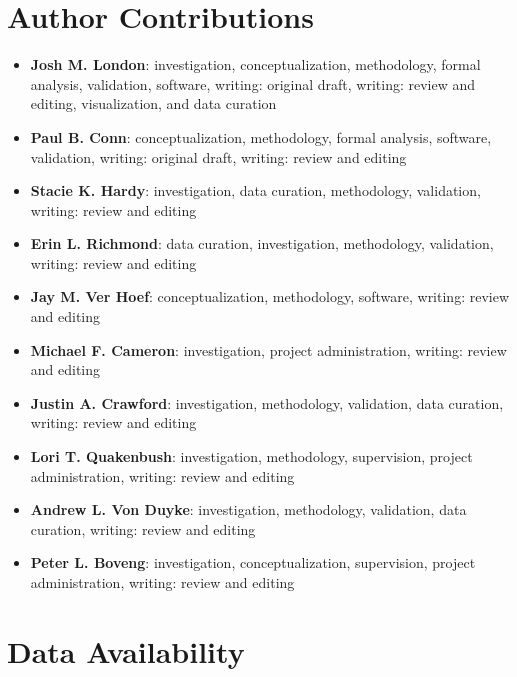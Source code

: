 \documentclass[fleqn,10pt,lineno]{wlpeerj} %
\providecommand{\tightlist}{%
  \setlength{\itemsep}{0pt}\setlength{\parskip}{0pt}}
\begin{document}
\section*{Author Contributions}\label{author-contributions}

\begin{itemize}
\tightlist
\item
  \textbf{Josh M. London}: investigation, conceptualization, methodology,
  formal analysis, validation, software, writing: original draft, writing:
  review and editing, visualization, and data curation
\item
  \textbf{Paul B. Conn}: conceptualization, methodology, formal analysis,
  software, validation, writing: original draft, writing: review and
  editing
\item
  \textbf{Stacie K. Hardy}: investigation, data curation, methodology,
  validation, writing: review and editing
\item
  \textbf{Erin L. Richmond}: data curation, investigation, methodology,
  validation, writing: review and editing
\item
  \textbf{Jay M. Ver Hoef}: conceptualization, methodology, software, writing:
  review and editing
\item
  \textbf{Michael F. Cameron}: investigation, project administration, writing:
  review and editing
\item
  \textbf{Justin A. Crawford}: investigation, methodology, validation, data curation,
  writing: review and editing
\item
  \textbf{Lori T. Quakenbush}: investigation, methodology, supervision, project
  administration, writing: review and editing
\item
  \textbf{Andrew L. Von Duyke}: investigation, methodology, validation, data curation,
  writing: review and editing
\item
  \textbf{Peter L. Boveng}: investigation, conceptualization, supervision,
  project administration, writing: review and editing
\end{itemize}

\section*{Data Availability}\label{data-availability}
\end{document}
